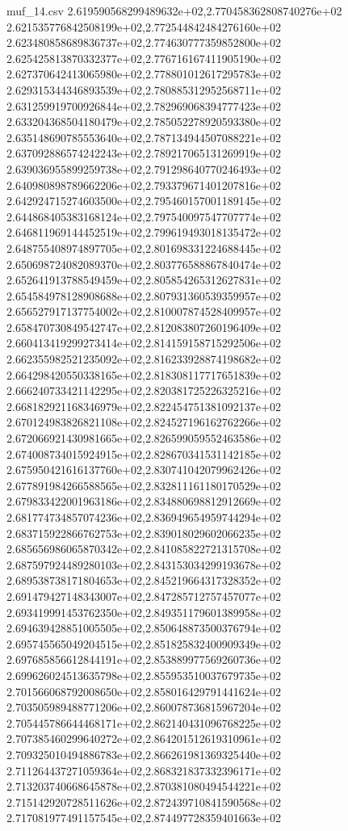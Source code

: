 \begin{filecontents*}{muf_14.csv}
2.619590568299489632e+02,2.770458362808740276e+02
2.621535776842508199e+02,2.772544842484276160e+02
2.623480858689836737e+02,2.774630777359852800e+02
2.625425813870332377e+02,2.776716167411905190e+02
2.627370642413065980e+02,2.778801012617295783e+02
2.629315344346893539e+02,2.780885312952568711e+02
2.631259919700926844e+02,2.782969068394777423e+02
2.633204368504180479e+02,2.785052278920593380e+02
2.635148690785553640e+02,2.787134944507088221e+02
2.637092886574242243e+02,2.789217065131269919e+02
2.639036955899259738e+02,2.791298640770246493e+02
2.640980898789662206e+02,2.793379671401207816e+02
2.642924715274603500e+02,2.795460157001189145e+02
2.644868405383168124e+02,2.797540097547707774e+02
2.646811969144452519e+02,2.799619493018135472e+02
2.648755408974897705e+02,2.801698331224688445e+02
2.650698724082089370e+02,2.803776588867840474e+02
2.652641913788549459e+02,2.805854265312627831e+02
2.654584978128908688e+02,2.807931360539359957e+02
2.656527917137754002e+02,2.810007874528409957e+02
2.658470730849542747e+02,2.812083807260196409e+02
2.660413419299273414e+02,2.814159158715292506e+02
2.662355982521235092e+02,2.816233928874198682e+02
2.664298420550338165e+02,2.818308117717651839e+02
2.666240733421142295e+02,2.820381725226325216e+02
2.668182921168346979e+02,2.822454751381092137e+02
2.670124983826821108e+02,2.824527196162762266e+02
2.672066921430981665e+02,2.826599059552463586e+02
2.674008734015924915e+02,2.828670341531142185e+02
2.675950421616137760e+02,2.830741042079962426e+02
2.677891984266588565e+02,2.832811161180170529e+02
2.679833422001963186e+02,2.834880698812912669e+02
2.681774734857074236e+02,2.836949654959744294e+02
2.683715922866762753e+02,2.839018029602066235e+02
2.685656986065870342e+02,2.841085822721315708e+02
2.687597924489280103e+02,2.843153034299193678e+02
2.689538738171804653e+02,2.845219664317328352e+02
2.691479427148343007e+02,2.847285712757457077e+02
2.693419991453762350e+02,2.849351179601389958e+02
2.694639428851005505e+02,2.850648873500376794e+02
2.695745565049204515e+02,2.851825832400909349e+02
2.697685856612844191e+02,2.853889977569260736e+02
2.699626024513635798e+02,2.855953510037679735e+02
2.701566068792008650e+02,2.858016429791441624e+02
2.703505989488771206e+02,2.860078736815967204e+02
2.705445786644468171e+02,2.862140431096768225e+02
2.707385460299640272e+02,2.864201512619310961e+02
2.709325010494886783e+02,2.866261981369325440e+02
2.711264437271059364e+02,2.868321837332396171e+02
2.713203740668645878e+02,2.870381080494544221e+02
2.715142920728511626e+02,2.872439710841590568e+02
2.717081977491157545e+02,2.874497728359401663e+02

\end{filecontents*}
